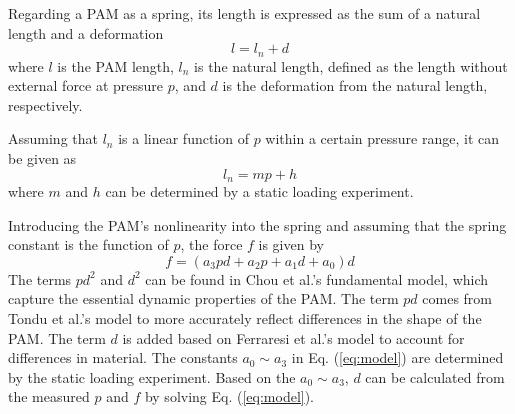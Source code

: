 Regarding a PAM as a spring\cite{spring}, its length is expressed as the sum of a natural length and a deformation 
\begin{equation}
   l = l_n + d
\label{eq:estimation}
\end{equation}
where $l$ is the PAM length, $l_n$ is the natural length, defined as the length without external force at pressure $p$, and $d$ is the deformation from the natural length, respectively.
 
Assuming that $l_n$ is a linear function of $p$ within a certain pressure range, it can be given as 
\begin{equation}
l_n = mp + h
\label{eq:L_n}
\end{equation}
where $m$ and $h$ can be determined by a static loading experiment.
 
Introducing the PAM's nonlinearity into the spring and assuming that the spring constant is the function of $p$\cite{spring}, the force $f$ is given by
\begin{equation}
\label{eq:model}
f = (a_3pd + a_2p + a_1d + a_0)d
\end{equation}
The terms $pd^2$ and $d^2$ can be found in Chou et al.'s fundamental model\cite{chouMeasurementModelingMcKibben1996}, which capture the essential dynamic properties of the PAM. The term $pd$  comes from Tondu et al.'s model\cite{ModelingControl} to more accurately reflect differences in the shape of the PAM. The term $d$ is added based on Ferraresi et al.'s model\cite{Comparison} to account for differences in material. The constants $a_0 \sim a_3$ in Eq. (\ref{eq:model}) are determined by the static loading experiment. Based on the $a_0 \sim a_3$, $d$  can be calculated from the measured $p$ and $f$ by solving Eq. (\ref{eq:model}).




%


